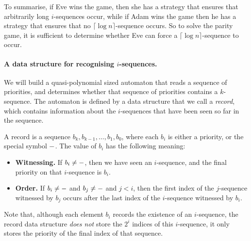To summarise, if Eve wins the game, then she has a strategy that ensures that
arbitrarily long $i$-sequences occur, while if Adam wins the game then he has a
strategy that ensures that no $\lceil \log n \rceil$-sequence occurs. So to
solve the parity game, it is sufficient to determine whether Eve can force a
$\lceil \log n \rceil$-sequence to occur.

\paragraph{\bf A data structure for recognising $i$-sequences.}
We will build a quasi-polynomial sized automaton that reads a sequence of
priorities, 
and determines whether that sequence of priorities contains a
$k$-sequence. 
The automaton is defined by a data structure that we call a \emph{record}, which
contains information about the $i$-sequences that have been seen so far in the
sequence.  

A record is a sequence $b_k, b_{k-1}, \dots, b_1, b_0$, where each
$b_i$ is either a priority, or the special symbol $\mathtt{-}$. The value of $b_i$
has the following meaning: 
\begin{itemize}
\item \textbf{Witnessing.} If $b_i \ne \mathtt{-}$, then we have seen an
$i$-sequence, and the final priority on that $i$-sequence is $b_i$. 
\item \textbf{Order.} If $b_i \ne \mathtt{-}$ and $b_j \ne \mathtt{-}$ and $j < i$,
then the first index of the $j$-sequence witnessed by $b_j$ occurs after the
last index of the $i$-sequence witnessed by $b_i$.
\end{itemize}
Note that, although each element $b_i$ records the existence of an
$i$-sequence, the record data structure \emph{does not} store the $2^i$ indices
of this $i$-sequence, it only stores the priority of the final index of that
sequence.

